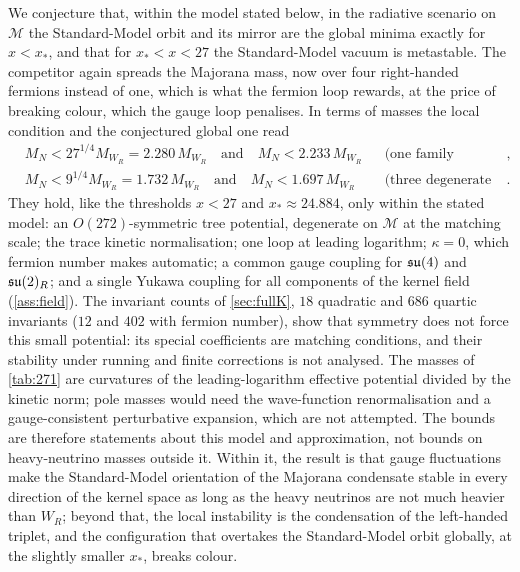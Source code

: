 We conjecture that, within the model stated below, in the radiative scenario on $\mathcal M$ the Standard-Model orbit and its mirror are the global minima
exactly for $x<x_*$, and that for $x_*<x<27$ the Standard-Model vacuum is metastable. The competitor again spreads the Majorana mass, now over four right-handed fermions instead of one, which is what the fermion loop
rewards, at the price of breaking colour, which the gauge loop penalises. In terms of masses the local condition and the conjectured global one read
\[
\begin{aligned}
&M_N<27^{1/4}M_{W_R}=2.280\,M_{W_R}\quad\text{and}\quad M_N<2.233\,M_{W_R}&&\text{(one family dominating)},\\
&M_N<9^{1/4}M_{W_R}=1.732\,M_{W_R}\quad\text{and}\quad M_N<1.697\,M_{W_R}&&\text{(three degenerate families)}.
\end{aligned}
\]
They hold, like the thresholds $x<27$ and $x_*\approx24.884$, only within the stated model: an $O(272)$-symmetric tree potential, degenerate on $\mathcal M$ at the
matching scale; the trace kinetic normalisation; one loop at leading logarithm; $\kappa=0$, which fermion number makes automatic; a common gauge coupling
for $\mathfrak{su}(4)$ and $\mathfrak{su}(2)_R$; and a single Yukawa coupling for all components of the kernel field (\cref{ass:field}). The invariant counts of \cref{sec:fullK}, $18$
quadratic and $686$ quartic invariants ($12$ and $402$ with fermion number), show that symmetry does not force this small potential: its special coefficients
are matching conditions, and their stability under running and finite corrections is not analysed. The masses of
\cref{tab:271} are curvatures of the leading-logarithm effective potential divided by the kinetic norm; pole masses would need the wave-function renormalisation and a
gauge-consistent perturbative expansion, which are not attempted. The bounds are therefore statements about this model and approximation, not bounds on heavy-neutrino
masses outside it. Within it, the result is that gauge fluctuations make the Standard-Model orientation of the
Majorana condensate stable in every direction of the kernel space as long as the heavy neutrinos are not much heavier than $W_R$; beyond that, the local instability is
the condensation of the left-handed triplet, and the configuration that overtakes the Standard-Model orbit globally, at the slightly smaller $x_*$, breaks colour.




